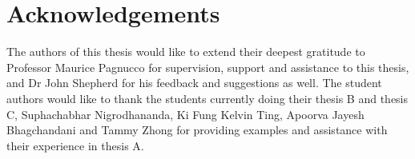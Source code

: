 \chapter*{Acknowledgements}\label{ack}

The authors of this thesis would like to extend their deepest gratitude to Professor Maurice Pagnucco for supervision, support and assistance to this thesis, and Dr John Shepherd for his feedback and suggestions as well.
The student authors would like to thank the students currently doing their thesis B and thesis C, Suphachabhar Nigrodhananda, Ki Fung Kelvin Ting, Apoorva Jayesh Bhagchandani and Tammy Zhong for providing examples and assistance with their experience in thesis A.
